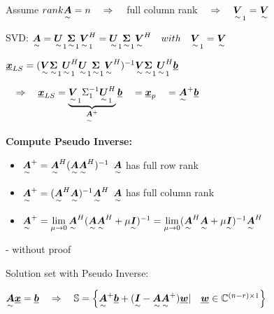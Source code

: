 Assume $rank\ma{A}=n \pfeil$ full column rank $\pfeil \ma{V}_1=\ma{V}$

SVD: $\ma{A}=\ma{U}_1\ma{\Sigma}_1\ma{V}_1^H=\ma{U}_1\ma{\Sigma}_1\ma{V}^H \quad with \quad \ma{V}_1=\ma{V} $

$\vec{x}_{LS}=(\ma{V}\ma{\Sigma}_1\ma{U}_1^H\ma{U}_1\ma{\Sigma}_1\ma{V}^H)^{-1} \ma{V}\ma{\Sigma}_1\ma{U}_1^H \vec{b}$

$\pfeil\vec{x}_{LS}=\underbrace{\ma{V}_1\Sigma_1^{-1}\ma{U}_1^H}_{\ma{A}^+}\vec{b}   \quad = \vec{x}_p \quad = \ma{A}^+\vec{b}$ 


\textbf{Compute Pseudo Inverse:}
\begin{itemize}
\item $\ma{A}^+=\ma{A}^H(\ma{A}\ma{A}^H)^{-1}$ \quad $\ma{A}$ has full row rank
\item $\ma{A}^+=(\ma{A}^H\ma{A})^{-1}\ma{A}^H$ \quad $\ma{A}$ has full column rank
\item $\ma{A}^+=\lim\limits_{\mu\to 0} \ma{A}^H(\ma{A}\ma{A}^H+\mu\ma{I})^{-1}
=\lim\limits_{\mu\to 0} (\ma{A}^H\ma{A}+\mu\ma{I})^{-1}\ma{A}^H$
\end{itemize}

\begin{flushright}- without proof\end{flushright}

Solution set with Pseudo Inverse:

$\ma{A}\vec{x}=\vec{b}\pfeil \mathbb{S}=\left\lbrace\ma{A}^+\vec{b}+(\ma{I}-\ma{A}\ma{A}^+)\vec{w} |\quad \vec{w}\in \mathbb{C}^{(n-r)\times 1}  \right\rbrace$


